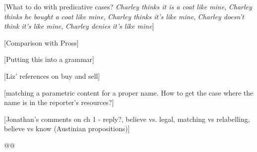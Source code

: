[What to do with predicative cases? \textit{Charley thinks it is a
  coat like mine}, \textit{Charley thinks he bought a coat like mine},
\textit{Charley thinks it's like mine},
\textit{Charley doesn't think it's like mine},
\textit{Charley denies it's like mine}]

[Comparison with Pross]

[Putting this into a grammar]    





[Liz' references on buy and sell] 
  
[matching a parametric content for a proper name.  How to get the case
where the name is in the reporter's resources?]  

[Jonathan's comments on ch 1 - reply?,  believe vs. legal,
matching vs relabelling, believe vs know (Austinian propositions)]

@@

